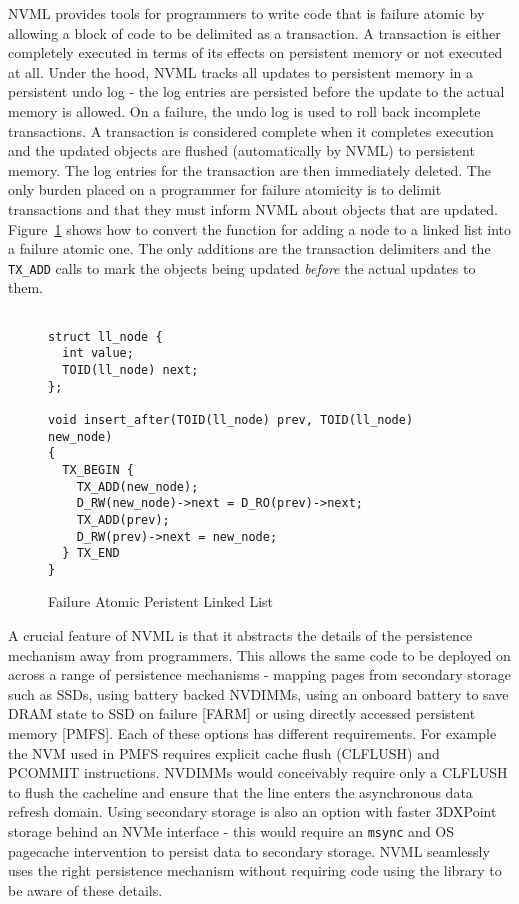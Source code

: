 \documentclass[twocolumn]{article}
\begin{document}
NVML provides tools for programmers to write code that is failure
atomic by allowing a block of code to be delimited as a transaction. A
transaction is either completely executed in terms of its effects on
persistent memory or not executed at all. Under the hood, NVML tracks all
updates to persistent memory in a persistent undo log - the log entries are
persisted before the update to the actual memory is allowed. On a failure, the
undo log is used to roll back incomplete transactions. A transaction is
considered complete when it completes execution and the updated objects are
flushed (automatically by NVML) to persistent memory. The log entries for the
transaction are then immediately deleted. The only burden placed on a programmer
for failure atomicity is to delimit transactions and that they must inform NVML
about objects that are updated. Figure~\ref{fig:example_fatomic} shows how to
convert the function for adding a node to a linked list into a failure atomic
one. The only additions are the transaction delimiters and the {\tt TX\_ADD}
calls to mark the objects being updated \emph{before} the actual updates to
them.

\begin{figure}
{ \scriptsize
\begin{verbatim}

struct ll_node {
  int value;
  TOID(ll_node) next;
};

void insert_after(TOID(ll_node) prev, TOID(ll_node) new_node)
{
  TX_BEGIN {
    TX_ADD(new_node);
    D_RW(new_node)->next = D_RO(prev)->next;
    TX_ADD(prev);
    D_RW(prev)->next = new_node;
  } TX_END
}

\end{verbatim}
}
\caption{Failure Atomic Peristent Linked List}
\label{fig:example_fatomic}
\end{figure}

A crucial feature of NVML is that it abstracts the details of the persistence
mechanism away from programmers. This allows the same code to be deployed on
across a range of persistence mechanisms - mapping pages from secondary
storage such as SSDs, using battery backed NVDIMMs, using an onboard battery to
save DRAM state to SSD on failure [FARM] or using directly accessed persistent
memory [PMFS]. Each of these options has different requirements. For example the
NVM used in PMFS requires explicit cache flush (CLFLUSH) and PCOMMIT
instructions. NVDIMMs would conceivably require only a CLFLUSH to flush the
cacheline and ensure that the line enters the asynchronous data refresh
domain. Using secondary storage is also an option with faster 3DXPoint storage
behind an NVMe interface - this would require an {\tt msync} and OS pagecache
intervention to persist data to secondary storage. NVML seamlessly uses the
right persistence mechanism without requiring code using the library to be aware
of these details.
\end{document}

